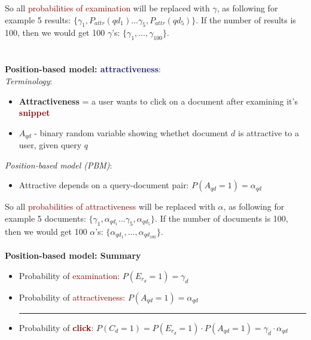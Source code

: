 So all \textcolor{Maroon}{probabilities of examination} will be replaced with $\gamma$, as following for example 5 results: $\{\gamma_1, P_{attr}(qd_1) \ldots \gamma_5, P_{attr}(qd_5)\}$. If the number of results is 100, then we would get 100 $\gamma$'s: $\{\gamma_1, \dots, \gamma_{100}\}$. \\
\\
\\
{\Large \textbf{Position-based model: \textcolor{MidnightBlue}{attractiveness}}}:\\
{\large \textit{Terminology}}:
\begin{itemize}
    \setlength\itemsep{0em}
    \item \textbf{Attractiveness} = a user wants to click on a document after examining it's \textbf{\textcolor{Maroon}{snippet}}
    \item $A_{qd}$ - binary random variable showing whethet document $d$ is attractive to a user, given query $q$
\end{itemize}

{\large \textit{Position-based model (PBM)}}:
\begin{itemize}
    \setlength\itemsep{0em}
    \item Attractive depends on a query-document pair: $P(A_{qd} = 1) = \alpha_{qd}$
\end{itemize} 

So all \textcolor{Maroon}{probabilities of attractiveness} will be replaced with $\alpha$, as following for example 5 documents: $\{\gamma_1, \alpha_{qd_1} \ldots \gamma_5, \alpha_{qd_5}\}$. If the number of documents is 100, then we would get 100 $\alpha$'s: $\{\alpha_{qd_1}, \dots, \alpha_{qd_{100}}\}$.\\
\\

\textbf{Position-based model: Summary}
\begin{itemize}
    \setlength\itemsep{0em}
    \item Probability of \textcolor{Maroon}{examination}: $P(E_{r_{d}} = 1) = \gamma_d$
    \item Probability of \textcolor{Maroon}{attractiveness}: $P(A_{qd} = 1) = \alpha_{qd}$
    \\
    \textcolor{red}{\rule{71ex}{1pt}}
    \item Probability of \textbf{\textcolor{Maroon}{click}}: $P(C_d = 1) = P(E_{r_{d}} = 1) \cdot P(A_{qd} = 1) = \gamma_d \cdot \alpha_{qd}$
\end{itemize}

